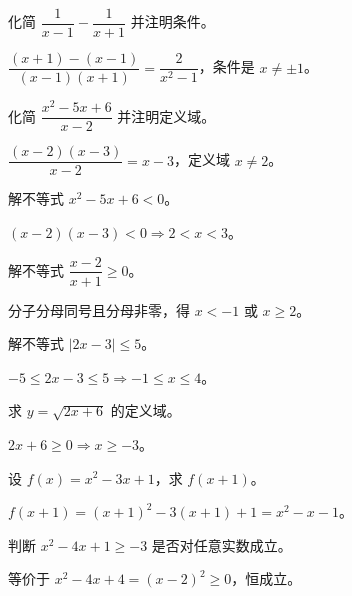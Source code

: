 \begin{problem}
化简 $\dfrac{1}{x-1}-\dfrac{1}{x+1}$ 并注明条件。
\end{problem}
\begin{solution}
$\dfrac{(x+1)-(x-1)}{(x-1)(x+1)}=\dfrac{2}{x^2-1}$，条件是 $x\ne\pm1$。
\end{solution}

\begin{problem}
化简 $\dfrac{x^2-5x+6}{x-2}$ 并注明定义域。
\end{problem}
\begin{solution}
$\dfrac{(x-2)(x-3)}{x-2}=x-3$，定义域 $x\ne2$。
\end{solution}

\begin{problem}
解不等式 $x^2-5x+6<0$。
\end{problem}
\begin{solution}
$(x-2)(x-3)<0\Rightarrow 2<x<3$。
\end{solution}

\begin{problem}
解不等式 $\dfrac{x-2}{x+1}\ge0$。
\end{problem}
\begin{solution}
分子分母同号且分母非零，得 $x<-1$ 或 $x\ge2$。
\end{solution}

\begin{problem}
解不等式 $|2x-3|\le5$。
\end{problem}
\begin{solution}
$-5\le 2x-3\le5\Rightarrow -1\le x\le4$。
\end{solution}

\begin{problem}
求 $y=\sqrt{2x+6}$ 的定义域。
\end{problem}
\begin{solution}
$2x+6\ge0\Rightarrow x\ge-3$。
\end{solution}

\begin{problem}
设 $f(x)=x^2-3x+1$，求 $f(x+1)$。
\end{problem}
\begin{solution}
$f(x+1)=(x+1)^2-3(x+1)+1=x^2-x-1$。
\end{solution}

\begin{problem}
判断 $x^2-4x+1\ge-3$ 是否对任意实数成立。
\end{problem}
\begin{solution}
等价于 $x^2-4x+4=(x-2)^2\ge0$，恒成立。
\end{solution}

